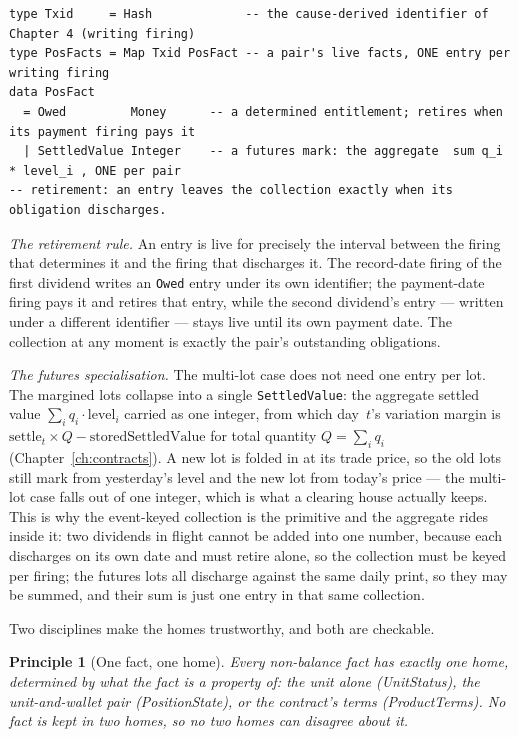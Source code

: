 \documentclass[11pt,a4paper]{article}
\newtheorem{principle}[definition]{Principle}
\begin{document}
\begin{lstlisting}
type Txid     = Hash             -- the cause-derived identifier of Chapter 4 (writing firing)
type PosFacts = Map Txid PosFact -- a pair's live facts, ONE entry per writing firing
data PosFact
  = Owed         Money      -- a determined entitlement; retires when its payment firing pays it
  | SettledValue Integer    -- a futures mark: the aggregate  sum q_i * level_i , ONE per pair
-- retirement: an entry leaves the collection exactly when its obligation discharges.
\end{lstlisting}

\emph{The retirement rule.} An entry is live for precisely the interval between the firing
that determines it and the firing that discharges it. The record-date firing of the first
dividend writes an \texttt{Owed} entry under its own identifier; the payment-date firing pays
it and retires that entry, while the second dividend's entry --- written under a different
identifier --- stays live until its own payment date. The collection at any moment is exactly
the pair's outstanding obligations.

\emph{The futures specialisation.} The multi-lot case does not need one entry per lot. The
margined lots collapse into a single \texttt{SettledValue}: the aggregate settled value
$\sum_i q_i \cdot \text{level}_i$ carried as one integer, from which day~$t$'s variation
margin is $\text{settle}_t \times Q - \text{storedSettledValue}$ for total quantity
$Q=\sum_i q_i$ (Chapter~\ref{ch:contracts}). A new lot is folded in at its trade price, so the
old lots still mark from yesterday's level and the new lot from today's price --- the
multi-lot case falls out of one integer, which is what a clearing house actually keeps. This
is why the event-keyed collection is the primitive and the aggregate rides inside it: two
dividends in flight cannot be added into one number, because each discharges on its own date
and must retire alone, so the collection must be keyed per firing; the futures lots all
discharge against the same daily print, so they may be summed, and their sum is just one entry
in that same collection.

Two disciplines make the homes trustworthy, and both are checkable.

\begin{principle}[One fact, one home]\label{prin:one-home}
Every non-balance fact has exactly one home, determined by what the fact is a property of:
the unit alone (UnitStatus), the unit-and-wallet pair (PositionState), or the contract's
terms (ProductTerms). No fact is kept in two homes, so no two homes can disagree about it.
\end{principle}
\end{document}
